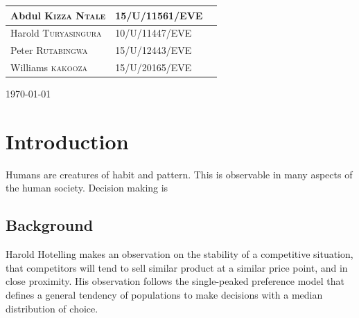 \documentclass[12pt, a4paper]{report}
\begin{document}
\begin{titlepage}


\begin{table}[!hb]
\centering
\begin{tabular}{|l|l|l|}
\hline
Abdul \textsc{Kizza Ntale} & \textsc{15/U/11561/EVE} \\ \hline
Harold \textsc{Turyasingura} & \textsc{10/U/11447/EVE} \\ \hline
Peter \textsc{Rutabingwa} & \textsc{15/U/12443/EVE} \\ \hline
Williams \textsc{kakooza} & \textsc{15/U/20165/EVE} \\
\hline
\end{tabular}
\end{table}

{\large \today}

\vfill

\end{titlepage}

\tableofcontents
\newpage

\sectionfont{\scshape}
\section*{Introduction}
Humans are creatures of habit and pattern. This is observable in many aspects of the human
society. Decision making is 

\subsection*{Background}
Harold Hotelling makes an observation on the stability of a competitive situation, that
competitors will tend to sell similar product at a similar price point, and in close proximity.
His observation follows the single-peaked preference model that defines a general tendency
of populations to make decisions with a median distribution of choice.\\
\end{document}

